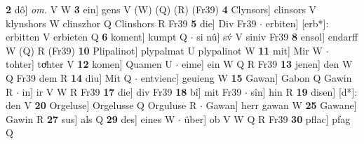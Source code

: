 \documentclass[8pt,a4paper,notitlepage]{article}
\begin{document}
\begin{table}[ht]
\begin{minipage}[t]{0.5\linewidth}
\textbf{2} dô] \textit{om.} V W \textbf{3} ein] gens V (W) (Q) (R) (Fr39) \textbf{4} Clynsors] clinsors V klynshors W clinszhor Q Clinshors R Fr39 \textbf{5} die] Div Fr39  $\cdot$ erbiten] [erb*]: erbitten V erbieten Q \textbf{6} koment] kumpt Q  $\cdot$ si nû] sv́ V siniv Fr39 \textbf{8} ensol] endarff W (Q) R (Fr39) \textbf{10} Plipalinot] plypalmat U plypalinot W \textbf{11} mit] Mir W  $\cdot$ tohter] toͤhter V \textbf{12} komen] Quamen U  $\cdot$ eime] ein W Q R Fr39 \textbf{13} jenen] den W Q Fr39 dem R \textbf{14} diu] Mit Q  $\cdot$ entvienc] geuieng W \textbf{15} Gawan] Gabon Q Gawin R  $\cdot$ in] ir V W R Fr39 \textbf{17} die] div Fr39 \textbf{18} bî] mit Fr39  $\cdot$ sîn] hin R \textbf{19} disen] [d*]: den V \textbf{20} Orgeluse] Orgelusse Q Orguluse R  $\cdot$ Gawan] herr gawan W \textbf{25} Gawane] Gawin R \textbf{27} sus] als Q \textbf{29} des] eines W  $\cdot$ über] ob V W Q R Fr39 \textbf{30} pflac] pfag Q \newline
\end{minipage}
\end{table}
\end{document}

